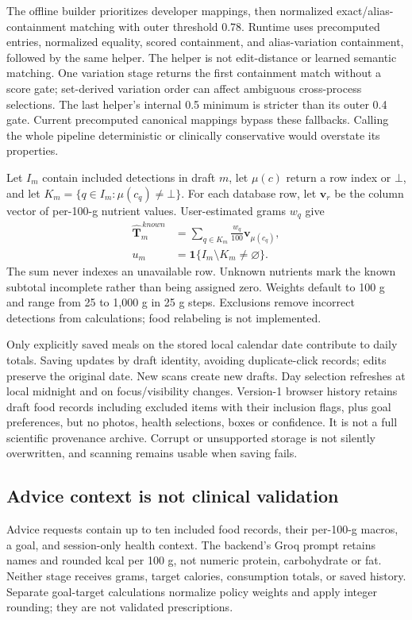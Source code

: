 \documentclass[conference]{IEEEtran}
\begin{document}
The offline builder prioritizes developer mappings, then normalized exact/alias-containment matching with outer threshold 0.78. Runtime uses precomputed entries, normalized equality, scored containment, and alias-variation containment, followed by the same helper. The helper is not edit-distance or learned semantic matching. One variation stage returns the first containment match without a score gate; set-derived variation order can affect ambiguous cross-process selections. The last helper's internal 0.5 minimum is stricter than its outer 0.4 gate. Current precomputed canonical mappings bypass these fallbacks. Calling the whole pipeline deterministic or clinically conservative would overstate its properties.

Let $I_m$ contain included detections in draft $m$, let $\mu(c)$ return a row index or $\bot$, and let $K_m=\{q\in I_m:\mu(c_q)\ne\bot\}$. For each database row, let $\mathbf v_r$ be the column vector of per-100-g nutrient values. User-estimated grams $w_q$ give
\begin{align}
\widehat{\mathbf T}_m^{\,known}&=\sum_{q\in K_m}\frac{w_q}{100}\mathbf v_{\mu(c_q)},\\
u_m&=\mathbf1\{I_m\setminus K_m\ne\varnothing\}.
\end{align}
The sum never indexes an unavailable row. Unknown nutrients mark the known subtotal incomplete rather than being assigned zero. Weights default to 100 g and range from 25 to 1,000 g in 25 g steps. Exclusions remove incorrect detections from calculations; food relabeling is not implemented.

Only explicitly saved meals on the stored local calendar date contribute to daily totals. Saving updates by draft identity, avoiding duplicate-click records; edits preserve the original date. New scans create new drafts. Day selection refreshes at local midnight and on focus/visibility changes. Version-1 browser history retains draft food records including excluded items with their inclusion flags, plus goal preferences, but no photos, health selections, boxes or confidence. It is not a full scientific provenance archive. Corrupt or unsupported storage is not silently overwritten, and scanning remains usable when saving fails.

\subsection{Advice context is not clinical validation}
Advice requests contain up to ten included food records, their per-100-g macros, a goal, and session-only health context. The backend's Groq prompt retains names and rounded kcal per 100 g, not numeric protein, carbohydrate or fat. Neither stage receives grams, target calories, consumption totals, or saved history. Separate goal-target calculations normalize policy weights and apply integer rounding; they are not validated prescriptions.
\end{document}
